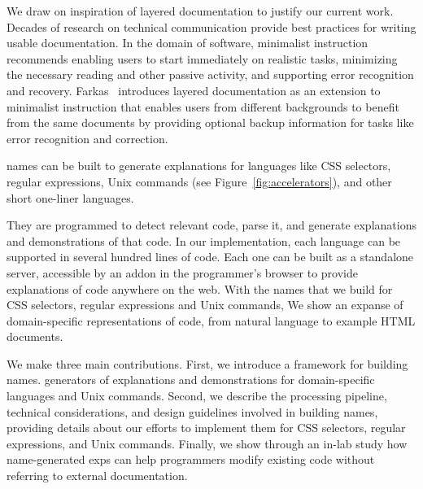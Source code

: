 We draw on inspiration of layered documentation to justify our current work. 
Decades of research on technical communication provide best practices for writing usable documentation.
In the domain of software, minimalist instruction~\cite{carroll_nurnberg_1990} recommends enabling users to start immediately on realistic tasks, minimizing the necessary  reading and other passive activity, and supporting error recognition and recovery.
Farkas~\cite{farkas_layering_1998} introduces layered documentation as an extension to minimalist instruction that enables users from different backgrounds to benefit from the same documents by providing optional backup information for tasks like error recognition and correction.
\fi 
%
\begin{changes}
\Glspl{name} can be built to generate explanations for languages like CSS selectors, regular expressions, Unix commands (see Figure~\ref{fig:accelerators}), and other short one-liner languages. 
\end{changes}
 They are programmed to detect relevant code, parse it, and generate explanations and demonstrations of that code. 
 \fi
In our implementation, each language can be supported in several hundred lines of code.
Each one can be built as a standalone server, accessible by an addon in the programmer's browser to provide explanations of code anywhere on the web.
 With the \Glspl{name} that we build for CSS selectors, regular expressions and Unix commands, \fi {} We show an expanse of domain-specific representations of code, from natural language to example HTML documents.\fi 

We make three main contributions.
First, we introduce a framework for building \Glspl{name}.  generators of explanations and demonstrations for domain-specific languages and Unix commands. \fi
Second, we describe the processing pipeline, technical considerations, and design guidelines involved in building \Glspl{name}, providing details about our efforts to implement them for CSS selectors, regular expressions, and Unix commands.
Finally, we show through an in-lab study how \Gls{name}-generated \glspl{exp} can help programmers modify existing code without referring to external documentation.
